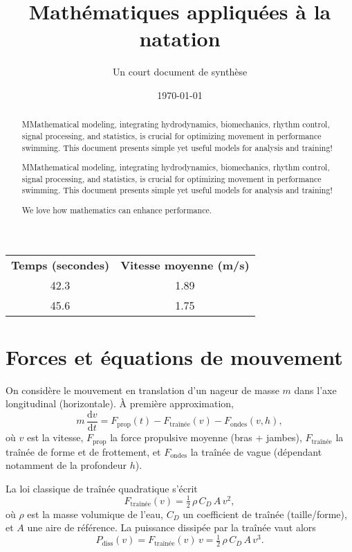 \documentclass[12pt,a4paper]{article}
\title{\textbf{Mathématiques appliquées à la natation}}
\author{Un court document de synthèse}
\date{\today}
\newcommand{\dd}{\mathrm{d}}
\begin{document}
\begin{longtable}{cc} \textbf{Temps (secondes)} & \textbf{Vitesse moyenne (m/s)} \\ [0.5pt] 42.3 & 1.89 \\ 45.6 & 1.75 \\ \end{longtable}

\begin{abstract}
MMathematical modeling, integrating hydrodynamics, biomechanics, rhythm control, signal processing, and statistics, is crucial for optimizing movement in performance swimming. This document presents simple yet useful models for analysis and training!

MMathematical modeling, integrating hydrodynamics, biomechanics, rhythm control, signal processing, and statistics, is crucial for optimizing movement in performance swimming. This document presents simple yet useful models for analysis and training!

We love  how mathematics can enhance performance.

\end{abstract}

\section{Forces et équations de mouvement}
On considère le mouvement en translation d'un nageur de masse $m$ dans l'axe longitudinal (horizontale). À première approximation,
\begin{equation}
 m\,\frac{\dd v}{\dd t} = F_{\mathrm{prop}}(t) - F_{\mathrm{traînée}}(v) - F_{\mathrm{ondes}}(v,h),
 \label{eq:newton}
\end{equation}
où $v$ est la vitesse, $F_{\mathrm{prop}}$ la force propulsive moyenne (bras + jambes), $F_{\mathrm{traînée}}$ la traînée de forme et de frottement, et $F_{\mathrm{ondes}}$ la traînée de vague (dépendant notamment de la profondeur $h$).

La loi classique de traînée quadratique s'écrit
\begin{equation}
 F_{\mathrm{traînée}}(v) = \tfrac{1}{2}\,\rho\,C_D\,A\,v^2,
 \end{equation}
où $\rho$ est la masse volumique de l'eau, $C_D$ un coefficient de traînée (taille/forme), et $A$ une aire de référence. La puissance dissipée par la traînée vaut alors
\begin{equation}
 P_{\mathrm{diss}}(v) = F_{\mathrm{traînée}}(v)\,v = \tfrac{1}{2}\,\rho\,C_D\,A\,v^3.
 \end{equation}
\end{document}

